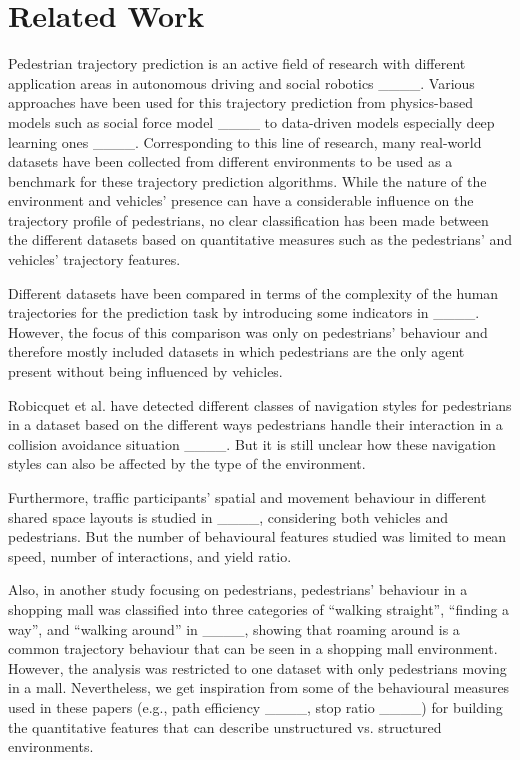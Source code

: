 \section{Related Work}
Pedestrian trajectory prediction is an active field of research with different application areas in autonomous driving and social robotics ____. Various approaches have been used for this trajectory prediction from physics-based models such as social force model ____ to data-driven models especially deep learning ones ____. Corresponding to this line of research, many real-world datasets have been collected from different environments to be used as a benchmark for these trajectory prediction algorithms. While the nature of the environment and vehicles' presence can have a considerable influence on the trajectory profile of pedestrians, no clear classification has been made between the different datasets based on quantitative measures such as the pedestrians’ and vehicles' trajectory features. 

Different datasets have been compared in terms of the complexity of the human trajectories for the prediction task by introducing some indicators in ____. However, the focus of this comparison was only on pedestrians’ behaviour and therefore mostly included datasets in which pedestrians are the only agent present without being influenced by vehicles. 

Robicquet et al. have detected different classes of navigation styles for pedestrians in a dataset based on the different ways pedestrians handle their interaction in a collision avoidance situation ____. But it is still unclear how these navigation styles can also be affected by the type of the environment. 

Furthermore, traffic participants’ spatial and movement behaviour in different shared space layouts is studied in ____, considering both vehicles and pedestrians. But the number of behavioural features studied was limited to mean speed, number of interactions, and yield ratio.

Also, in another study focusing on pedestrians, pedestrians’ behaviour in a shopping mall was classified into three categories of “walking straight”,  “finding a way”, and “walking around” in ____, showing that roaming around is a common trajectory behaviour that can be seen in a shopping mall environment.
However, the analysis was restricted to one dataset with only pedestrians moving in a mall. Nevertheless, we get inspiration from some of the behavioural measures used in these papers (e.g., path efficiency ____, stop ratio ____) for building the quantitative features that can describe unstructured vs. structured environments.